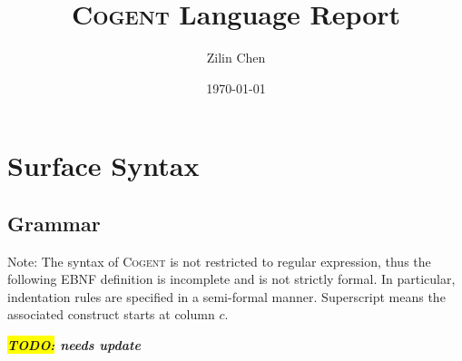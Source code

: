 \documentclass[a4paper]{article}
\newcommand{\TODO}[1]{\textbf{\textsl{\colorbox{yellow}{TODO:} #1}}}
\newcommand{\todo}[1]{\TODO{#1}}
\newcommand{\cogent}{\textsc{Cogent}\xspace}
\begin{document}
\title{\cogent Language Report}
\author{Zilin Chen}
\date{\today}

\maketitle

\section{Surface Syntax}

\subsection{Grammar} \label{ssec:grammar}
Note: The syntax of \cogent is not restricted to regular expression, thus the following EBNF definition is incomplete and is
not strictly formal. In particular, indentation rules are specified in a semi-formal manner. Superscript  means
the associated construct starts at column $c$.

\todo{needs update}
\end{document}

